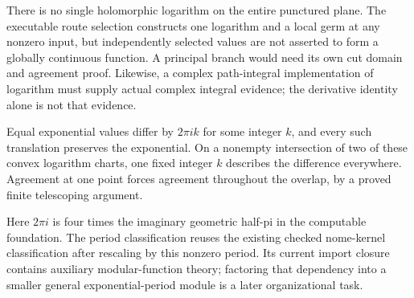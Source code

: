 There is no single holomorphic logarithm on the entire punctured plane.
The executable route selection constructs one logarithm and a local germ at
any nonzero input, but independently selected values are not asserted to form
a globally continuous function. A principal branch would need its own cut
domain and agreement proof. Likewise, a complex path-integral implementation
of logarithm must supply actual complex integral evidence; the derivative
identity alone is not that evidence.

\leanok

\begin{theorem}
\leanok
Equal exponential values differ by $2\pi i k$ for some integer $k$, and every
such translation preserves the exponential. On a nonempty intersection of
two of these convex logarithm charts, one fixed integer $k$ describes the
difference everywhere. Agreement at one point forces agreement throughout
the overlap, by a proved finite telescoping argument.
\end{theorem}

Here $2\pi i$ is four times the imaginary geometric half-pi in the computable
foundation. The period classification reuses the existing checked nome-kernel
classification after rescaling by this nonzero period. Its current import
closure contains auxiliary modular-function theory; factoring that dependency
into a smaller general exponential-period module is a later organizational task.
